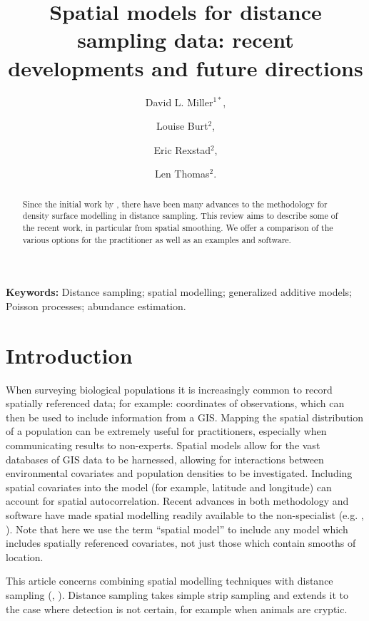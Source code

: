 \documentclass[a4paper,12pt]{article}
\title{Spatial models for distance sampling data: recent developments and future directions}
\author{
David L. Miller$^{1*}$, \and
Louise Burt$^{2}$, \and
Eric Rexstad$^{2}$, \and 
Len Thomas$^{2}$.}
\begin{document}
\maketitle


\begin{abstract}
  \noindent 
Since the initial work by \cite{Hedley:2004et}, there have been many advances to the methodology for density surface modelling in distance sampling. This review aims to describe some of the recent work, in particular from spatial smoothing.  We offer a comparison of the various options for the practitioner as well as an examples and software.

\end{abstract}

\noindent \textbf{Keywords:} Distance sampling; spatial modelling; generalized additive models; Poisson processes; abundance estimation.



\newpage


\section*{Introduction}

\label{s:intro}


When surveying biological populations it is increasingly common to record spatially referenced data; for example: coordinates of observations, which can then be used to include information from a GIS. Mapping the spatial distribution of a population can be extremely useful for practitioners, especially when communicating results to non-experts. Spatial models allow for the vast databases of GIS data to be harnessed, allowing for interactions between environmental covariates and population densities to be investigated. Including spatial covariates into the model (for example, latitude and longitude) can account for spatial autocorrelation. Recent advances in both methodology and software have made spatial modelling readily available to the non-specialist (e.g. \cite{Wood:2006wz}, \cite{Rue:2009tw}). Note that  here we use the term ``spatial model'' to include any model which includes spatially referenced covariates, not just those which contain smooths of location.

This article concerns combining spatial modelling techniques with distance sampling (\cite{Buckland:2001vm}, \cite{Buckland:2004ts}). Distance sampling takes simple strip sampling and extends it to the case where detection is not certain, for example when animals are cryptic. 
\end{document}
